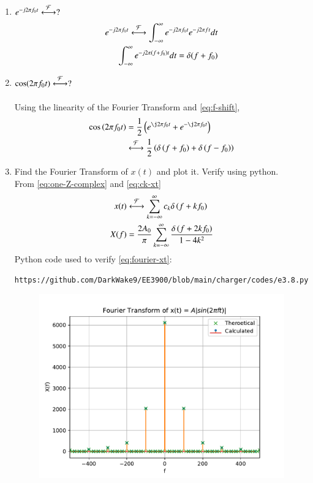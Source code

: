 \documentclass[journal,12pt,twocolumn]{IEEEtran}
\renewcommand\thesection{\arabic{section}}
\begin{document}
\begin{enumerate}[label=\thesection.\arabic*
,ref=\thesection.\theenumi]
\begin{align}
	= e^{\j 2\pi (0) t} = 1
	\label{eq:fourier-delta}
\end{align}
\item $e^{-j2\pi f_0t}\overset{\mathcal{F}}{ \longleftrightarrow}?$\\
\solution %
\begin{align}
	e^{-j2\pi f_0t}\overset{\mathcal{F}}{ \longleftrightarrow} \int_{-\infty}^{\infty} e^{-j2\pi f_0t} e^{-j2\pi ft}dt\\
	\int_{-\infty}^{\infty} e^{-j2\pi (f+f_0)t} dt
	=\delta(f+f_0)
	\label{eq:f-shift}
\end{align}
\item $\cos(2\pi f_0t)\overset{\mathcal{F}}{ \longleftrightarrow}?$\\
\solution\\
Using the linearity of the Fourier Transform and \eqref{eq:f-shift},
\begin{align}
	\cos\brak{2\pi f_0t} &= \frac{1}{2}
	\brak{e^{\j2\pi f_0t} + e^{-\j2\pi f_0t}} \nonumber \\ 
	&\system{F}\frac{1}{2}\brak{\delta\brak{f+f_0} + \delta\brak{f-f_0}}
\end{align}
 \item Find the Fourier Transform of $x(t)$ and plot it.  Verify using python.\\
 \solution From \eqref{eq:one-Z-complex} and \eqref{eq:ck-xt}
\begin{align}
 x(t)&\overset{\mathcal{F}}{ \longleftrightarrow}\sum_{k=-\infty}^{\infty}c_k\delta\left(f+kf_0\right) \\
 X(f)&=\frac{2A_0}{\pi}\sum_{k=-\infty}^{\infty}\frac{\delta\left(f+2kf_0\right)}{1-4k^2}
 \label{eq:fourier-xt}
\end{align}
Python code used to verify \eqref{eq:fourier-xt}:
\begin{lstlisting}
https://github.com/DarkWake9/EE3900/blob/main/charger/codes/e3.8.py
\end{lstlisting}
\begin{figure}[!ht]
	\begin{center}
		\includegraphics[width=\columnwidth]{./figs/e3.8.pdf}

\end{center}
\end{figure}
\end{enumerate}
\end{document}
